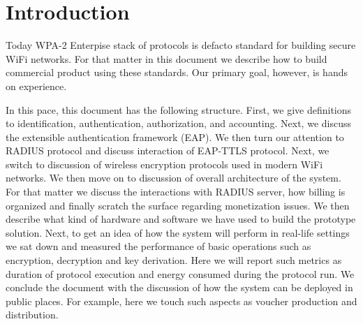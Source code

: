 \section{Introduction}
\label{section:introduction}

Today WPA-2 Enterpise stack of protocols is defacto standard 
for building secure WiFi networks. For that matter in this 
document we describe how to build commercial product using 
these standards. Our primary goal, however, is hands on experience.

In this pace, this document has the following structure.
First, we give definitions to identification, authentication, authorization,
and accounting. Next, we discuss the extensible authentication framework (EAP).
We then turn our attention to RADIUS protocol and discuss interaction 
of EAP-TTLS protocol. Next, we switch to discussion of wireless encryption protocols used in
modern WiFi networks. We then move on to discussion of overall 
architecture of the system. For that matter we discuss the interactions with RADIUS server,
how billing is organized and finally scratch the surface regarding
monetization issues. We then describe what kind of hardware and software 
we have used to build the prototype solution. 
Next, to get an idea of how the system will perform in real-life settings 
we sat down and measured the performance of basic 
operations such as encryption, decryption and key derivation. Here we will 
report such metrics as duration of protocol execution and energy 
consumed during the protocol run. We conclude the document with the 
discussion of how the system can be deployed in public places. 
For example, here we touch such aspects as voucher production and 
distribution.